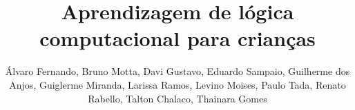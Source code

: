 \sloppy

\title{Aprendizagem de lógica computacional para crianças}

\author{Álvaro Fernando, Bruno Motta, Davi Gustavo, Eduardo Sampaio, Guilherme dos Anjos, Guiglerme Miranda, Larissa Ramos, Levino Moises, Paulo Tada, Renato Rabello, Talton Chalaco, Thainara Gomes}
\author{}

\address{Faculdade Gama - Universidade de Brasília (UnB)}

